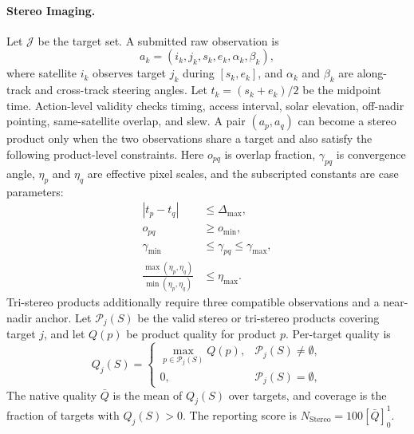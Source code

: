 \documentclass[]{mosi}
\begin{document}
\paragraph{Stereo Imaging.} Let \(\mathcal{J}\) be the target set. A submitted raw observation is
\[
  a_k=(i_k,j_k,s_k,e_k,\alpha_k,\beta_k),
\]
where satellite \(i_k\) observes target \(j_k\) during \([s_k,e_k]\), and \(\alpha_k\) and \(\beta_k\) are along-track and cross-track steering angles. Let \(t_k=(s_k+e_k)/2\) be the midpoint time. Action-level validity checks timing, access interval, solar elevation, off-nadir pointing, same-satellite overlap, and slew. A pair \((a_p,a_q)\) can become a stereo product only when the two observations share a target and also satisfy the following product-level constraints. Here \(o_{pq}\) is overlap fraction, \(\gamma_{pq}\) is convergence angle, \(\eta_p\) and \(\eta_q\) are effective pixel scales, and the subscripted constants are case parameters:
\[
  \begin{aligned}
  |t_p-t_q|&\le \Delta_{\max},\\
  o_{pq}&\ge o_{\min},\\
  \gamma_{\min}&\le \gamma_{pq}\le \gamma_{\max},\\
  \frac{\max(\eta_p,\eta_q)}{\min(\eta_p,\eta_q)}&\le \eta_{\max}.
  \end{aligned}
\]
Tri-stereo products additionally require three compatible observations and a near-nadir anchor. Let \(\mathcal{P}_j(S)\) be the valid stereo or tri-stereo products covering target \(j\), and let \(Q(p)\) be product quality for product \(p\). Per-target quality is
\[
  Q_j(S)=
  \begin{cases}
    \max_{p\in\mathcal{P}_j(S)} Q(p), & \mathcal{P}_j(S)\ne\emptyset,\\
    0, & \mathcal{P}_j(S)=\emptyset,
  \end{cases}
\]
The native quality \(\bar{Q}\) is the mean of \(Q_j(S)\) over targets, and coverage is the fraction of targets with \(Q_j(S)>0\). The reporting score is \(N_{\mathrm{Stereo}}=100[\bar{Q}]_0^1\).
\end{document}
